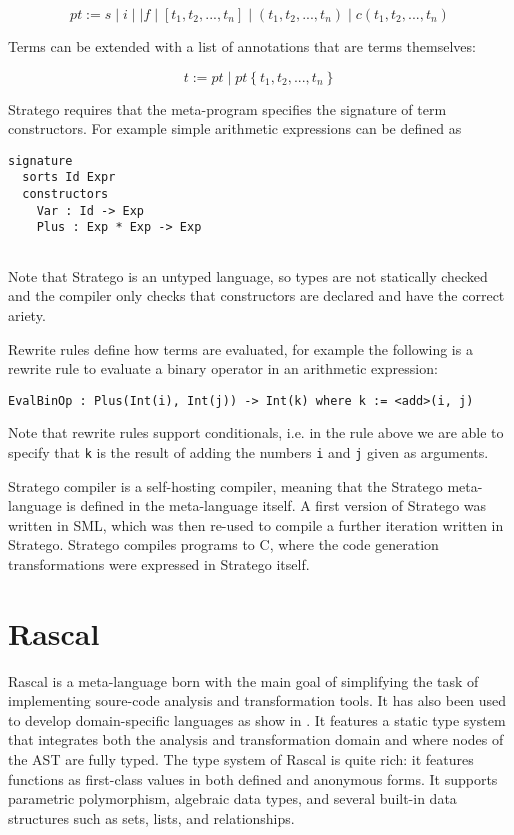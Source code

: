 \begin{equation*}
pt := s \; | \; i \; | \; | f \; | \; [t_{1},t_{2},...,t_{n}] \; | \; (t_{1},t_{2},...,t_{n}) \; | \; c(t_{1},t_{2},...,t_{n})
\end{equation*}

\noindent
Terms can be extended with a list of annotations that are terms themselves:

\begin{equation*}
t := pt \; | \; pt\left\lbrace t_{1},t_{2},...,t_{n} \right\rbrace
\end{equation*}

\noindent
Stratego requires that the meta-program specifies the signature of term constructors. For example simple arithmetic expressions can be defined as

\begin{lstlisting}
signature
  sorts Id Expr
  constructors
    Var : Id -> Exp
    Plus : Exp * Exp -> Exp
    
\end{lstlisting}

\noindent
Note that Stratego is an untyped language, so types are not statically checked and the compiler only checks that constructors are declared and have the correct ariety.

Rewrite rules define how terms are evaluated, for example the following is a rewrite rule to evaluate a binary operator in an arithmetic expression:

\begin{lstlisting}
EvalBinOp : Plus(Int(i), Int(j)) -> Int(k) where k := <add>(i, j)
\end{lstlisting}

\noindent
Note that rewrite rules support conditionals, i.e. in the rule above we are able to specify that \texttt{k} is the result of adding the numbers \texttt{i} and \texttt{j} given as arguments.

Stratego compiler is a self-hosting compiler, meaning that the Stratego meta-language is defined in the meta-language itself. A first version of Stratego was written in SML, which was then re-used to compile a further iteration written in Stratego. Stratego compiles programs to C, where the code generation transformations were expressed in Stratego itself.

\section{Rascal}
Rascal \cite{bos2011rascal, klint2009rascal} is a meta-language born with the main goal of simplifying the task of implementing soure-code analysis and transformation tools. It has also been used to develop domain-specific languages as show in \cite{BASTEN20157}. It features a static type system that integrates both the analysis and transformation domain and where nodes of the AST are fully typed. The type system of Rascal is quite rich: it features functions as first-class values \cite{scott2009programming} in both defined and anonymous forms. It supports parametric polymorphism, algebraic data types, and several built-in data structures such as sets, lists, and relationships.

